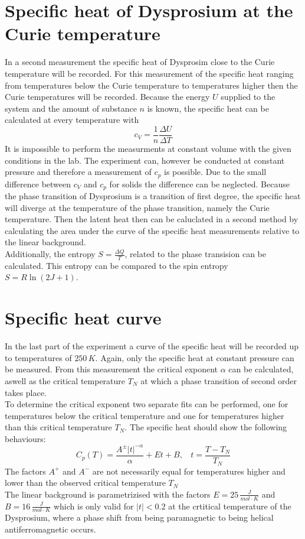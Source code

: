 \documentclass{include/thesisclass3}
\newcommand{\cc}{\cdot}
\newcommand{\e}[1]{\,\si{#1}}
\begin{document}
\section{Specific heat of Dysprosium at the Curie temperature}
In a second measurement the specific heat of Dysprosim close to the Curie temperature will be recorded. 
For this  measurement of the specific heat ranging from temperatures below the Curie temperature to temperatures higher then the Curie temperatures will be recorded. 
Because the energy $U$ supplied to the system and the amount of substance $n$ is known, the specific heat can be calculated at every temperature with
\[
c_V = \frac{1}{n} \frac{\Delta U}{\Delta T}
\]
It is impossible to perform the measurments at constant volume with the given conditions in the lab. The experiment can, however be conducted at constant pressure and therefore a measurement of $c_p$ is possible. Due to the small difference between $c_V$ and $c_p$ for solids the difference can be neglected.
Because the phase transition of Dysprosium is a transition of first degree, the specific heat will diverge at the temperature of the phase transition, namely the Curie temperature.
Then the latent heat then can be caluclated in a second method by calculating the area under the curve of the specific heat measurements relative to the linear background.\\
Additionally, the entropy $S = \frac{\Delta Q}{T}$, related to the phase transision can be calculated.
This entropy can be compared to the spin entropy $S = R \ln (2 J + 1)$.


\section{Specific heat curve}
\label{neel}
In the last part of the experiment a curve of the specific heat will be recorded up to temperatures of $250\e{K}$.
Again, only the specific heat at constant pressure can be measured.
From this measurement the critical exponent $\alpha$ can be calculated, aswell as the critical temperature $T_N$ at which a phase transition of second order takes place.\\
To determine the critical exponent two separate fits can be performed, one for temperatures below the critical temperature and one for temperatures higher than this critical temperature $T_N$.
The specific heat should show the following behaviours:
\[ C_p(T) = \frac{ A^\pm |t|^{-\alpha}}{\alpha} + Et + B, ~~~~ t = \frac{T-T_N}{T_N}\]
The factors $A^+$ and $A^-$ are not necessarily equal for temperatures higher and lower than the observed critical temperature $T_N$\\
The linear background is parametrizised with the factors $E = 25 \e{\frac{J}{mol\cc K}}$ and $B = 16\e{\frac{J}{mol \cc K}}$ which is only valid for $|t| < 0.2$ at the crtitical temperature of the Dysprosium, where a phase shift from being paramagnetic to being helical antiferromagnetic occurs.
\end{document}

